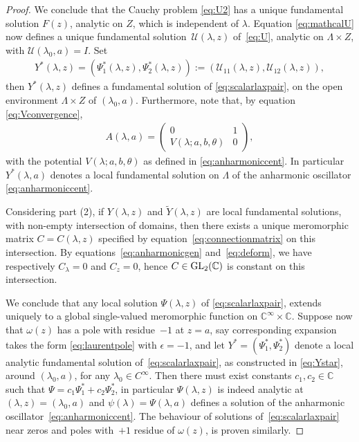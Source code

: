 \documentclass[pdftex]{sigma}
\numberwithin{equation}{section}
\newcommand{\om}{\omega}
\begin{document}
\begin{proof}
We conclude that the Cauchy problem \eqref{eq:U2} has a unique fundamental solution $F(z)$, ana\-ly\-tic on $Z$, which is independent of $\lambda$. Equation \eqref{eq:mathcalU} now def\/ines a unique fundamental solu\-tion~$\mathcal{U}(\lambda,z)$ of~\eqref{eq:U}, analytic on $\Lambda\times Z$, with $\mathcal{U}(\lambda_0,a)=I$. Set
\begin{gather}\label{eq:Ystar}
Y^*(\lambda,z)=(\Psi_1^*(\lambda,z),\Psi_2^*(\lambda,z)):=(\mathcal{U}_{11}(\lambda,z),\mathcal{U}_{12}(\lambda,z)),
\end{gather}
then $Y^*(\lambda,z)$ def\/ines a fundamental solution of \eqref{eq:scalarlaxpair}, on the open environment $\Lambda\times Z$ of $(\lambda_0,a)$. Furthermore, note that, by equation \eqref{eq:Vconvergence},
\begin{gather*}
A(\lambda,a)=\begin{pmatrix}
0 & 1\\
V(\lambda;a,b,\theta) & 0
\end{pmatrix},
\end{gather*}
with the potential $V(\lambda;a,b,\theta)$ as def\/ined in \eqref{eq:anharmoniccent}. In particular $Y^*(\lambda,a)$ denotes a local fundamental solution on $\Lambda$ of the anharmonic oscillator \eqref{eq:anharmoniccent}.

Considering part (2), if $Y(\lambda,z)$ and $\widetilde{Y}(\lambda,z)$ are local fundamental solutions, with non-empty intersection of domains, then there exists a unique meromorphic matrix $C=C(\lambda,z)$ specif\/ied by equation~\eqref{eq:connectionmatrix} on this intersection. By equations~\eqref{eq:anharmonicgen} and~\eqref{eq:deform}, we have respectively $C_\lambda=0$ and $C_z=0$, hence $C\in {\rm GL}_2(\mathbb{C})$ is constant on this intersection.

We conclude that any local solution $\Psi(\lambda,z)$ of \eqref{eq:scalarlaxpair}, extends uniquely to a global single-valued meromorphic function on $\mathbb{C}^\infty\times \mathbb{C}$. Suppose now that $\om(z)$ has a pole with residue~$-1$ at $z=a$, say corresponding expansion takes the form \eqref{eq:laurentpole} with $\epsilon=-1$, and let $Y^*=(\Psi_1^*,\Psi_2^*)$ denote a local analytic fundamental solution of~\eqref{eq:scalarlaxpair}, as constructed in \eqref{eq:Ystar}, around $(\lambda_0,a)$, for any $\lambda_0\in C^\infty$. Then there must exist constants $c_1,c_2\in\mathbb{C}$ such that $\Psi=c_1\Psi_1^*+c_2\Psi_2^*$, in particular $\Psi(\lambda,z)$ is indeed analytic at $(\lambda,z)=(\lambda_0,a)$ and $\psi(\lambda)=\Psi(\lambda,a)$ def\/ines a solution of the anharmonic oscillator~\eqref{eq:anharmoniccent}. The behaviour of solutions of~\eqref{eq:scalarlaxpair} near zeros and poles with~$+1$ residue of $\omega(z)$, is proven similarly.
\end{proof}
\end{document}
